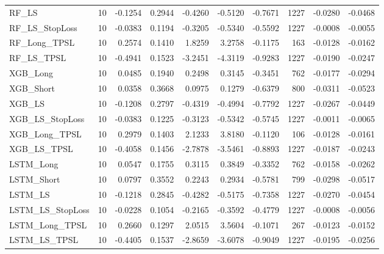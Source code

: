 \begin{tabular}{llrrrrrrrr}
RF\_LS & 10 & -0.1254 & 0.2944 & -0.4260 & -0.5120 & -0.7671 & 1227 & -0.0280 & -0.0468 \\
\cline{1-10}
RF\_LS\_StopLoss & 10 & -0.0383 & 0.1194 & -0.3205 & -0.5340 & -0.5592 & 1227 & -0.0008 & -0.0055 \\
\cline{1-10}
RF\_Long\_TPSL & 10 & 0.2574 & 0.1410 & 1.8259 & 3.2758 & -0.1175 & 163 & -0.0128 & -0.0162 \\
\cline{1-10}
RF\_LS\_TPSL & 10 & -0.4941 & 0.1523 & -3.2451 & -4.3119 & -0.9283 & 1227 & -0.0190 & -0.0247 \\
\cline{1-10}
XGB\_Long & 10 & 0.0485 & 0.1940 & 0.2498 & 0.3145 & -0.3451 & 762 & -0.0177 & -0.0294 \\
\cline{1-10}
XGB\_Short & 10 & 0.0358 & 0.3668 & 0.0975 & 0.1279 & -0.6379 & 800 & -0.0311 & -0.0523 \\
\cline{1-10}
XGB\_LS & 10 & -0.1208 & 0.2797 & -0.4319 & -0.4994 & -0.7792 & 1227 & -0.0267 & -0.0449 \\
\cline{1-10}
XGB\_LS\_StopLoss & 10 & -0.0383 & 0.1225 & -0.3123 & -0.5342 & -0.5745 & 1227 & -0.0011 & -0.0065 \\
\cline{1-10}
XGB\_Long\_TPSL & 10 & 0.2979 & 0.1403 & 2.1233 & 3.8180 & -0.1120 & 106 & -0.0128 & -0.0161 \\
\cline{1-10}
XGB\_LS\_TPSL & 10 & -0.4058 & 0.1456 & -2.7878 & -3.5461 & -0.8893 & 1227 & -0.0187 & -0.0243 \\
\cline{1-10}
LSTM\_Long & 10 & 0.0547 & 0.1755 & 0.3115 & 0.3849 & -0.3352 & 762 & -0.0158 & -0.0262 \\
\cline{1-10}
LSTM\_Short & 10 & 0.0797 & 0.3552 & 0.2243 & 0.2934 & -0.5781 & 799 & -0.0298 & -0.0517 \\
\cline{1-10}
LSTM\_LS & 10 & -0.1218 & 0.2845 & -0.4282 & -0.5175 & -0.7358 & 1227 & -0.0270 & -0.0454 \\
\cline{1-10}
LSTM\_LS\_StopLoss & 10 & -0.0228 & 0.1054 & -0.2165 & -0.3592 & -0.4779 & 1227 & -0.0008 & -0.0056 \\
\cline{1-10}
LSTM\_Long\_TPSL & 10 & 0.2660 & 0.1297 & 2.0515 & 3.5604 & -0.1071 & 267 & -0.0123 & -0.0152 \\
\cline{1-10}
LSTM\_LS\_TPSL & 10 & -0.4405 & 0.1537 & -2.8659 & -3.6078 & -0.9049 & 1227 & -0.0195 & -0.0256 \\
\cline{1-10}
\bottomrule
\end{tabular}
